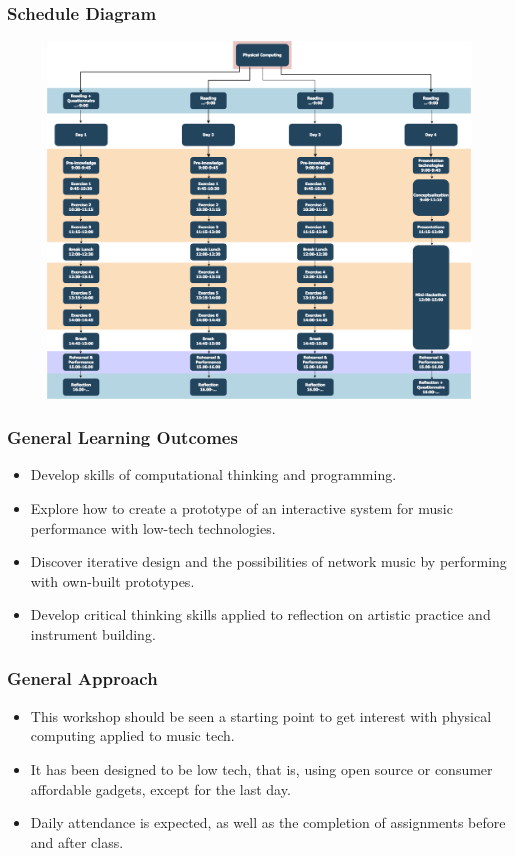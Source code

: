 \documentclass[screen, aspectratio=43]{beamer}
\begin{document}
\begin{frame}
\frametitle{Schedule Diagram}
\begin{figure}
\includegraphics[scale=0.17]{img/Outline-PC-workshop.png}
\end{figure}
\end{frame}
%
\begin{frame}
\frametitle{General Learning Outcomes}
\begin{itemize}
\item Develop skills of computational thinking and programming.
\item Explore how to create a prototype of an interactive system for music performance with low-tech technologies.
\item Discover iterative design and the possibilities of network music by performing with own-built prototypes.
\item Develop critical thinking skills applied to reflection on artistic practice and instrument building.
\end{itemize}
\end{frame}
%
\begin{frame}
\frametitle{General Approach}
\begin{itemize}
\item This workshop should be seen a starting point to get interest with physical computing applied to music tech.
\item It has been designed to be low tech, that is, using open source or consumer affordable gadgets, except for the last day.
\item Daily attendance is expected, as well as the completion of assignments before and after class.
\end{itemize}
\end{frame}
\end{document}
